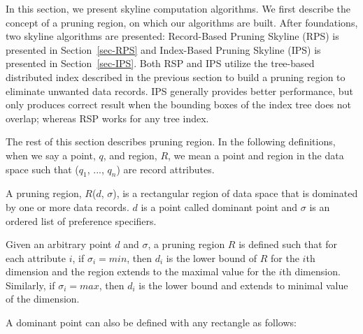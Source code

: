In this section, we present skyline computation algorithms. We first describe the concept of a pruning region, on which our algorithms are built. After foundations, two skyline algorithms are presented: Record-Based Pruning Skyline (RPS) is presented in Section~\ref{sec-RPS} and Index-Based Pruning Skyline (IPS) is presented in Section~\ref{sec-IPS}. Both RSP and IPS utilize the tree-based distributed index described in the previous section to build a pruning region to eliminate unwanted data records. IPS generally provides better performance, but only produces correct result when the bounding boxes of the index tree does not overlap; whereas RSP works for any tree index.

The rest of this section describes pruning region. In the following definitions, when we say a point, $q$, and region, $R$, we mean a point and region in the data space such that ($q_1$, ..., $q_n$) are record attributes.



\begin{definition}
A pruning region, $R$($d$, $\sigma$), is a rectangular region of data space that is dominated by one or more data records. $d$ is a point called dominant point and $\sigma$ is an ordered list of preference specifiers.
\end{definition}

Given an arbitrary point $d$ and $\sigma$, a pruning region $R$ is defined such that for each attribute $i$, if $\sigma_i = min$, then $d_i$ is the lower bound of $R$ for the $i$th dimension and the region extends to the maximal value for the $i$th dimension. Similarly, if $\sigma_i = max$, then $d_i$ is the lower bound and extends to minimal value of the dimension.

A dominant point can also be defined with any rectangle as follows:

